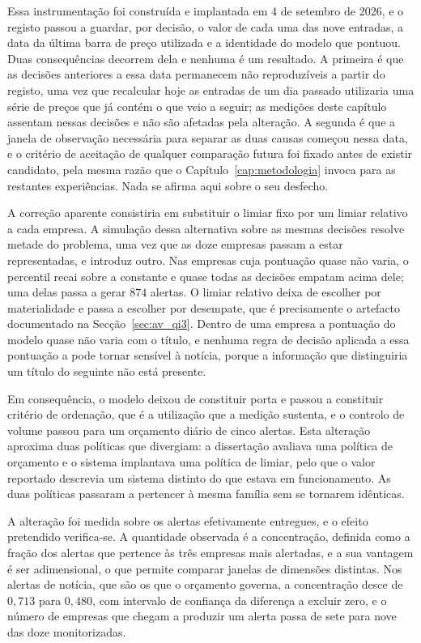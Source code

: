 Essa instrumentação foi construída e implantada em 4 de setembro de 2026, e o registo passou a
guardar, por decisão, o valor de cada uma das nove entradas, a data da última barra de preço
utilizada e a identidade do modelo que pontuou. Duas consequências decorrem dela e nenhuma é um
resultado. A primeira é que as decisões anteriores a essa data permanecem não reproduzíveis a
partir do registo, uma vez que recalcular hoje as entradas de um dia passado utilizaria uma série
de preços que já contém o que veio a seguir; as medições deste capítulo assentam nessas decisões
e não são afetadas pela alteração. A segunda é que a janela de observação necessária para separar
as duas causas começou nessa data, e o critério de aceitação de qualquer comparação futura foi
fixado antes de existir candidato, pela mesma razão que o Capítulo~\ref{cap:metodologia}
invoca para as restantes experiências. Nada se afirma aqui sobre o seu desfecho.

A correção aparente consistiria em substituir o limiar fixo por um limiar relativo a cada empresa. A simulação dessa alternativa sobre as mesmas decisões resolve metade do problema, uma vez que as
doze empresas passam a estar representadas, e introduz outro. Nas empresas cuja pontuação quase
não varia, o percentil recai sobre a constante e quase todas as decisões empatam acima dele; uma
delas passa a gerar $874$ alertas. O limiar relativo deixa de escolher por materialidade e passa a
escolher por desempate, que é precisamente o artefacto documentado na Secção~\ref{sec:av_qi3}. Dentro
de uma empresa a pontuação do modelo quase não varia com o título, e nenhuma regra de decisão
aplicada a essa pontuação a pode tornar sensível à notícia, porque a informação que distinguiria um
título do seguinte não está presente.

Em consequência, o modelo deixou de constituir porta e passou a constituir critério de ordenação, que
é a utilização que a medição sustenta, e o controlo de volume passou para um orçamento diário de
cinco alertas. Esta alteração aproxima duas políticas que divergiam: a dissertação avaliava uma
política de orçamento e o sistema implantava uma política de limiar, pelo que o valor reportado
descrevia um sistema distinto do que estava em funcionamento. As duas políticas passaram a pertencer
à mesma família sem se tornarem idênticas.

A alteração foi medida sobre os alertas efetivamente entregues, e o efeito pretendido
verifica-se. A quantidade observada é a concentração, definida como a fração dos alertas que
pertence às três empresas mais alertadas, e a sua vantagem é ser adimensional, o que permite
comparar janelas de dimensões distintas. Nos alertas de notícia, que são os que o orçamento
governa, a concentração desce de $0{,}713$ para $0{,}480$, com intervalo de confiança da
diferença a excluir zero, e o número de empresas que chegam a produzir um alerta passa de sete
para nove das doze monitorizadas.

